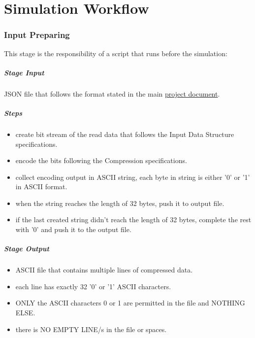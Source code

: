 \documentclass[12pt]{report}
\begin{document}
\part{Simulation Workflow}
\section{Input Preparing}
This stage is the responsibility of a script that runs before the simulation:
\subsubsection{Stage Input}
JSON file that follows the format stated in the main \href{https://docs.google.com/document/d/10A55BSsqfsHDiRTdhKYW2H_w3TB4mgXQe5GLBEdv4iM/edit}{project document}. %

\subsubsection{Steps}
\begin{itemize}
    \item create bit stream of the read data that follows the {Input Data Structure} specifications.
    \item encode the bits following the {Compression} specifications.
    \item collect encoding output in ASCII string, each byte in string is either '0' or '1' in ASCII format.
    \item when the string reaches the length of 32 bytes, push it to output file.
    \item if the last created string didn't reach the length of 32 bytes, complete the rest with '0' and push it to the output file.    
\end{itemize}

\subsubsection{Stage Output}
\begin{itemize}
    \item ASCII file that contains multiple lines of compressed data.
    \item each line has exactly 32 '0' or '1' ASCII characters.
    \item ONLY the ASCII characters 0 or 1 are permitted in the file and NOTHING ELSE.
    \item there is NO EMPTY LINE/s in the file or spaces.
\end{itemize}
\end{document}
